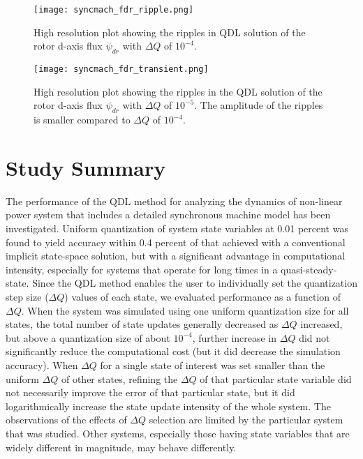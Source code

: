 \begin{figure}[h]
    \centering
    \texttt{[image: syncmach\_fdr\_ripple.png]}
    \caption{High resolution plot showing the ripples in QDL solution of the rotor d-axis flux $\psi_{dr}$ with $\Delta Q$ of $10^{-4}$.}
    \label{fig:syncmach_fdr_ripple}
\end{figure}

\begin{figure}[h]
    \centering
    \texttt{[image: syncmach\_fdr\_transient.png]}
    \caption{High resolution plot showing the ripples in the QDL solution of the rotor d-axis flux $\psi_{dr}$ with $\Delta Q$ of $10^{-5}$. The amplitude of the ripples is smaller compared to $\Delta Q$ of $10^{-4}$.}
    \label{fig:syncmach_fdr_transient}
\end{figure}

\section{Study Summary}

The performance of the QDL method for analyzing the dynamics of non-linear power system that includes a detailed synchronous machine model has been investigated. Uniform quantization of system state variables at 0.01 percent was found to yield accuracy within 0.4 percent of that achieved with a conventional implicit state-space solution, but with a significant advantage in computational intensity, especially for systems that operate for long times in a quasi-steady-state. Since the QDL method enables the user to individually set the quantization step size ($\Delta Q$) values of each state, we evaluated performance as a function of $\Delta Q$. When the system was simulated using one uniform quantization size for all states, the total number of state updates generally decreased as $\Delta Q$ increased, but above a quantization size of about $10^{-4}$, further increase in $\Delta Q$ did not significantly reduce the computational cost (but it did decrease the simulation accuracy). When $\Delta Q$ for a single state of interest was set smaller than the uniform $\Delta Q$ of other states, refining the $\Delta Q$ of that particular state variable did not necessarily improve the error of that particular state, but it did logarithmically increase the state update intensity of the whole system. The observations of the effects of $\Delta Q$ selection are limited by the particular system that was studied. Other systems, especially those having state variables that are widely different in magnitude, may behave differently.
